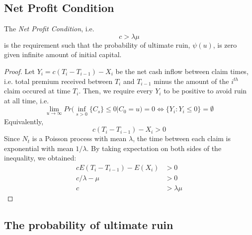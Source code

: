 \documentclass[12pt]{article}
\begin{document}

\subsection{Net Profit Condition}
The \textit{Net Profit Condition}, i.e. 
    \begin{equation}\label{NPC}
        c > \lambda\mu
    \end{equation}
is the requirement such that the probability of ultimate ruin, \(\psi(u)\), is zero 
given infinite amount of initial capital.
    \begin{proof} 
    Let \(Y_i=c(T_{i}-T_{i-1})-X_i\) be the net cash inflow between claim times, i.e. total premium received between \(T_i\) and \(T_{i-1}\) minus the amount of the \(i^{th}\) claim occured at time \(T_{i}\). Then, we require every \(Y_i\) to be positive to avoid ruin at all time, i.e.
    \[\lim_{u\to\infty}Pr\Big(\inf_{s>0}\{C_s\}\leq0|C_0=u\Big)=0 \Longleftrightarrow \{Y_i:Y_i\leq0\}=\emptyset\]
    Equivalently,
    \[c(T_{i}-T_{i-1})-X_i>0\]
    Since \(N_t\) is a Poisson process with mean \(\lambda\), the time between each claim is exponential with mean \(1/\lambda\). By taking expectation on both sides of the inequality, we obtained:
    \begin{align*}
    {cE(T_{i}-T_{i-1})-E(X_i)}&>{0}\\
    {c/\lambda-\mu}&>{0}\\
    {c}&>{\lambda\mu}
    \end{align*}
    \end{proof}


\subsection{The probability of ultimate ruin}
\end{document}
